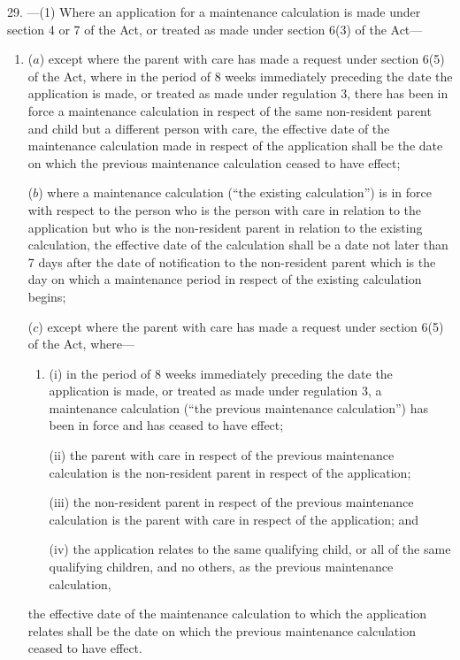 \documentclass[12pt,a4paper]{article}
\begin{document}
29.%
---(1)  %
  Where an application for a maintenance calculation is made under section 4 or 7 of the Act, or treated as made under section 6(3) of the Act—
\begin{enumerate}\item[]
($a$) except where the parent with care has made a request under section 6(5) of the Act, where in the period of 8 weeks immediately preceding the date the application is made, or treated as made under regulation 3, there has been in force a maintenance calculation in respect of the same non-resident parent and child but a different person with care, the effective date of the maintenance calculation made in respect of the application shall be %
the date  %
on which the previous maintenance calculation ceased to have effect;

($b$) where a maintenance calculation (“the existing calculation”) is in force with respect to the person who is the person with care in relation to the application but who is the non-resident parent in relation to the existing calculation, the effective date of the calculation shall be a date not later than 7 days after the date of notification to the non-resident parent which is the day on which a maintenance period in respect of the existing calculation begins;

($c$) except where the parent with care has made a request under section 6(5) of the Act, where—
\begin{enumerate}\item[]
(i) in the period of 8 weeks immediately preceding the date the application is made, or treated as made under regulation 3, a maintenance calculation (“the previous maintenance calculation”) has been in force and has ceased to have effect;

(ii) the parent with care in respect of the previous maintenance calculation is the non-resident parent in respect of the application;

(iii) the non-resident parent in respect of the previous maintenance calculation is the parent with care in respect of the application; and

(iv) the application relates to the same qualifying child, or all of the same qualifying children, and no others, as the previous maintenance calculation,
\end{enumerate}
the effective date of the maintenance calculation to which the application relates shall be the date on which the previous maintenance calculation ceased to have effect.
\end{enumerate}
\end{document}
